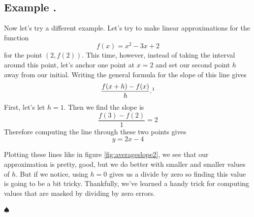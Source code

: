 \documentclass[11pt]{article}
\numberwithin{lemma}{section}
\numberwithin{equation}{section}
\numberwithin{define}{section}
\numberwithin{prop}{section}
\numberwithin{figure}{section}
\numberwithin{thm}{section}
\numberwithin{cor}{section}
\newcounter{ex}[section]
\newenvironment{ex}[0]{

	\refstepcounter{ex}
    \subsection*{Example \theex .}
    }
    {
    \hfill$\spadesuit$
    \par
    }
\numberwithin{ex}{section}
\begin{document}
\begin{ex}
	Now let's try a different example. Let's try to make linear approximations for the function
	$$f(x)=x^2-3x+2$$
	for the point $(2,f(2))$. This time, however, instead of taking the interval around this point, let's anchor one point at $x=2$ and set our second point $h$ away from our initial. Writing the general formula for the slope of this line gives
	$$\frac{f(x+h)-f(x)}{h}.\footnotemark$$
	First, let's let $h=1$. Then we find the slope is
	$$\frac{f(3)-f(2)}{1}=2$$
	Therefore computing the line through these two points gives
	$$y=2x-4$$
	\begin{figure}
	\centering
		\caption{}
		\label{fig:averageslope2}
	\end{figure}
	Plotting these lines like in figure \eqref{fig:averageslope2}, we see that our approximation is pretty, good, but we do better with smaller and smaller values of $h$. But if we notice, using $h=0$ gives us a divide by zero so finding this value is going to be a bit tricky. Thankfully, we've learned a handy trick for computing values that are masked by dividing by zero errors.
\end{ex}
\end{document}
